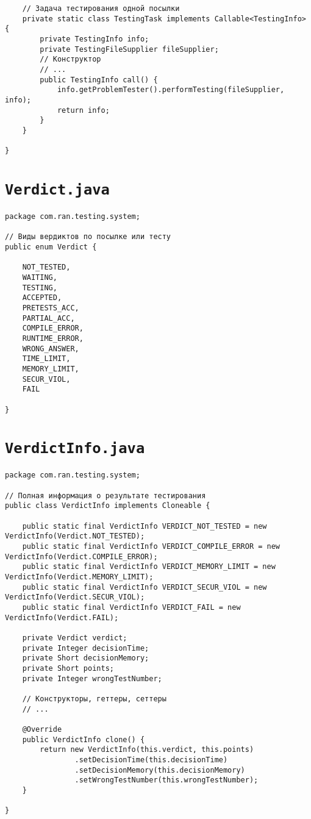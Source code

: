 \begin{verbatim}
    // Задача тестирования одной посылки
    private static class TestingTask implements Callable<TestingInfo> {
        private TestingInfo info;
        private TestingFileSupplier fileSupplier;
        // Конструктор
        // ...
        public TestingInfo call() {
            info.getProblemTester().performTesting(fileSupplier, info);
            return info;
        }
    }
    
}
\end{verbatim}

\section*{\texttt{Verdict.java}}
\begin{verbatim}
package com.ran.testing.system;

// Виды вердиктов по посылке или тесту
public enum Verdict {

    NOT_TESTED,
    WAITING,
    TESTING,
    ACCEPTED,
    PRETESTS_ACC,
    PARTIAL_ACC,
    COMPILE_ERROR,
    RUNTIME_ERROR,
    WRONG_ANSWER,
    TIME_LIMIT,
    MEMORY_LIMIT,
    SECUR_VIOL,
    FAIL

}
\end{verbatim}

\section*{\texttt{VerdictInfo.java}}
\begin{verbatim}
package com.ran.testing.system;

// Полная информация о результате тестирования
public class VerdictInfo implements Cloneable {

    public static final VerdictInfo VERDICT_NOT_TESTED = new VerdictInfo(Verdict.NOT_TESTED);
    public static final VerdictInfo VERDICT_COMPILE_ERROR = new VerdictInfo(Verdict.COMPILE_ERROR);
    public static final VerdictInfo VERDICT_MEMORY_LIMIT = new VerdictInfo(Verdict.MEMORY_LIMIT);
    public static final VerdictInfo VERDICT_SECUR_VIOL = new VerdictInfo(Verdict.SECUR_VIOL);
    public static final VerdictInfo VERDICT_FAIL = new VerdictInfo(Verdict.FAIL);

    private Verdict verdict;
    private Integer decisionTime;
    private Short decisionMemory;
    private Short points;
    private Integer wrongTestNumber;

    // Конструкторы, геттеры, сеттеры
    // ...

    @Override
    public VerdictInfo clone() {
        return new VerdictInfo(this.verdict, this.points)
                .setDecisionTime(this.decisionTime)
                .setDecisionMemory(this.decisionMemory)
                .setWrongTestNumber(this.wrongTestNumber);
    }

}
\end{verbatim}

